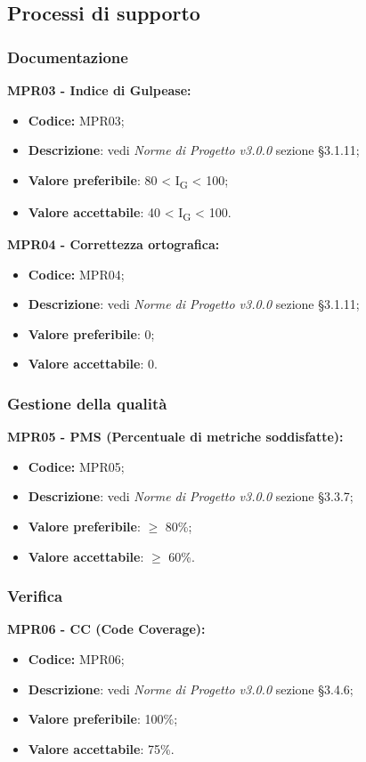 \subsection{Processi di supporto}
\subsubsection{Documentazione}
\textbf{MPR03 - Indice di Gulpease:}
\begin{itemize}
    \item \textbf{Codice:} MPR03;
    \item \textbf{Descrizione}: vedi \textit{Norme di Progetto v3.0.0} sezione \S 3.1.11;
    \item \textbf{Valore preferibile}: 80 < I\textsubscript{G} < 100;
    \item \textbf{Valore accettabile}: 40 < I\textsubscript{G} < 100.
\end{itemize}
\textbf{MPR04 - Correttezza ortografica:}
\begin{itemize}
    \item \textbf{Codice:} MPR04;
    \item \textbf{Descrizione}: vedi \textit{Norme di Progetto v3.0.0} sezione \S 3.1.11;
    \item \textbf{Valore preferibile}: 0;
    \item \textbf{Valore accettabile}: 0.
\end{itemize}
\subsubsection{Gestione della qualità}
\textbf{MPR05 - PMS (Percentuale di metriche soddisfatte):}
\begin{itemize}
    \item \textbf{Codice:} MPR05;
    \item \textbf{Descrizione}: vedi \textit{Norme di Progetto v3.0.0} sezione \S 3.3.7;
    \item \textbf{Valore preferibile}: $\geq$ 80\%;
    \item \textbf{Valore accettabile}: $\geq$ 60\%.
\end{itemize}
\subsubsection{Verifica}
\textbf{MPR06 - CC (Code Coverage):}
\begin{itemize}
    \item \textbf{Codice:} MPR06;
    \item \textbf{Descrizione}: vedi \textit{Norme di Progetto v3.0.0} sezione \S 3.4.6;
    \item \textbf{Valore preferibile}: 100\%;
    \item \textbf{Valore accettabile}: 75\%.
\end{itemize}

